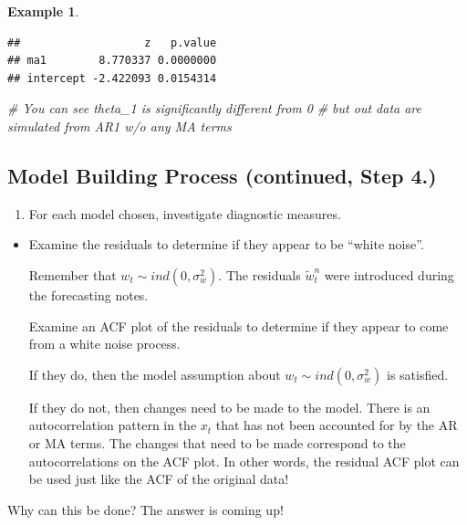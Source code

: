 \documentclass[
]{book}
\newenvironment{Shaded}{\begin{snugshade}}{\end{snugshade}}
\newcommand{\CommentTok}[1]{\textcolor[rgb]{0.56,0.35,0.01}{\textit{#1}}}
\providecommand{\tightlist}{%
  \setlength{\itemsep}{0pt}\setlength{\parskip}{0pt}}
\theoremstyle{definition}
\theoremstyle{definition}
\newtheorem{example}{Example}[chapter]
\theoremstyle{definition}
\theoremstyle{definition}
\theoremstyle{remark}
\begin{document}
\begin{example}
\begin{verbatim}
##                   z   p.value
## ma1        8.770337 0.0000000
## intercept -2.422093 0.0154314
\end{verbatim}

\begin{Shaded}
\begin{Highlighting}[]
\CommentTok{\# You can see theta\_1 is significantly different from 0}
\CommentTok{\# but out data are simulated from AR1 w/o any MA terms}
\end{Highlighting}
\end{Shaded}

\end{example}

\hypertarget{model-building-process-continued-step-4.}{%
\subsection{Model Building Process (continued, Step 4.)}\label{model-building-process-continued-step-4.}}

\begin{enumerate}
\def\labelenumi{\arabic{enumi}.}
\setcounter{enumi}{3}
\tightlist
\item
  For each model chosen, investigate diagnostic measures.
\end{enumerate}

\begin{itemize}
\item
  Examine the residuals to determine if they appear to be ``white noise''.

  Remember that \(w_t \sim ind (0,\sigma_w^2)\). The residuals \(\tilde w_t^n\) were introduced during the forecasting notes.

  Examine an ACF plot of the residuals to determine if they appear to come from a white noise process.

  If they do, then the model assumption about \(w_t \sim ind (0,\sigma_w^2)\) is satisfied.

  If they do not, then changes need to be made to the model. There is an autocorrelation pattern in the \(x_t\) that has not been accounted for by the AR or MA terms. The changes that need to be made correspond to the autocorrelations on the ACF plot. In other words, the residual ACF plot can be used just like the ACF of the original data!
\end{itemize}

Why can this be done? The answer is coming up!
\end{document}
